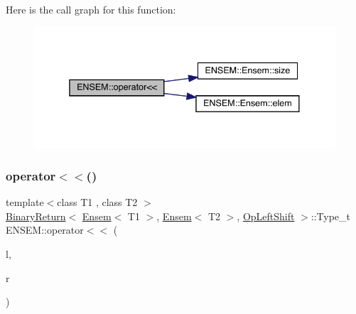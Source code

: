 Here is the call graph for this function\+:\nopagebreak
\begin{figure}[H]
\begin{center}
\leavevmode
\includegraphics[width=338pt]{d1/d9e/group__eensem_ga6ec953adfd003a66dd85074b0e1ad399_cgraph}
\end{center}
\end{figure}
\mbox{\label{group__eensem_ga822a79ca0b7e9ffdd3c9fbfaad909967}} 
\subsubsection{\texorpdfstring{operator$<$$<$()}{operator<<()}\hspace{0.1cm}{\footnotesize\ttfamily [2/4]}}
{\footnotesize\ttfamily template$<$class T1 , class T2 $>$ \\
\mbox{\hyperlink{structENSEM_1_1BinaryReturn}{Binary\+Return}}$<$ \mbox{\hyperlink{classENSEM_1_1Ensem}{Ensem}}$<$ T1 $>$, \mbox{\hyperlink{classENSEM_1_1Ensem}{Ensem}}$<$ T2 $>$, \mbox{\hyperlink{structENSEM_1_1OpLeftShift}{Op\+Left\+Shift}} $>$\+::Type\+\_\+t E\+N\+S\+E\+M\+::operator$<$$<$ (\begin{DoxyParamCaption}\item[{const \mbox{\hyperlink{classENSEM_1_1Ensem}{Ensem}}$<$ T1 $>$ \&}]{l,  }\item[{const \mbox{\hyperlink{classENSEM_1_1Ensem}{Ensem}}$<$ T2 $>$ \&}]{r }\end{DoxyParamCaption})\hspace{0.3cm}{\ttfamily [inline]}}

